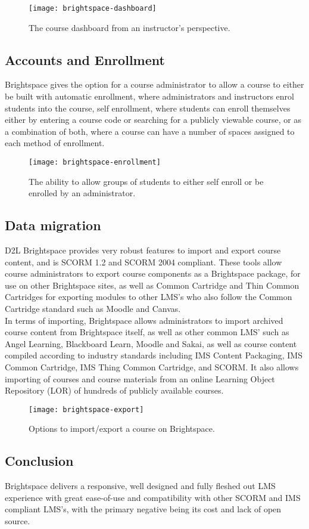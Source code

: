 \begin{figure}
\centering
\texttt{[image: brightspace-dashboard]}
\caption{The course dashboard from an instructor's perspective.}
\end{figure}

\subsection{Accounts and Enrollment}
Brightspace gives the option for a course administrator to allow a course to either be built with automatic enrollment, where administrators and instructors enrol students into the course, self enrollment, where students can enroll themselves either by entering a course code or searching for a publicly viewable course, or as a combination of both, where a course can have a number of spaces assigned to each method of enrollment.

\begin{figure}
\centering
\texttt{[image: brightspace-enrollment]}
\caption{The ability to allow groups of students to either self enroll or be enrolled by an administrator.}
\end{figure}

\subsection{Data migration}
D2L Brightspace provides very robust features to import and export course content, and is SCORM 1.2 and SCORM 2004 compliant. These tools allow course administrators to export course components as a Brightspace package, for use on other Brightspace sites, as well as Common Cartridge and Thin Common Cartridges for exporting modules to other LMS's who also follow the Common Cartridge standard such as Moodle and Canvas.\\
In terms of importing, Brightspace allows administrators to import archived course content from Brightspace itself, as well as other common LMS' such as Angel Learning, Blackboard Learn, Moodle and Sakai, as well as course content compiled according to industry standards including IMS Content Packaging, IMS Common Cartridge, IMS Thing Common Cartridge, and SCORM. It also allows importing of courses and course materials from an online Learning Object Repository (LOR) of hundreds of publicly available courses.\\

\begin{figure}
\centering
\texttt{[image: brightspace-export]}
\caption{Options to import/export a course on Brightspace.}
\end{figure}

\subsection{Conclusion}
Brightspace delivers a responsive, well designed and fully fleshed out LMS experience with great ease-of-use and compatibility with other SCORM and IMS compliant LMS's, with the primary negative being its cost and lack of open source.